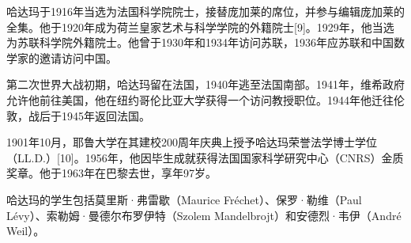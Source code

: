 哈达玛于1916年当选为法国科学院院士，接替庞加莱的席位，并参与编辑庞加莱的全集。他于1920年成为荷兰皇家艺术与科学学院的外籍院士[9]。1929年，他当选为苏联科学院外籍院士。他曾于1930年和1934年访问苏联，1936年应苏联和中国数学家的邀请访问中国。

第二次世界大战初期，哈达玛留在法国，1940年逃至法国南部。1941年，维希政府允许他前往美国，他在纽约哥伦比亚大学获得一个访问教授职位。1944年他迁往伦敦，战后于1945年返回法国。

1901年10月，耶鲁大学在其建校200周年庆典上授予哈达玛荣誉法学博士学位（LL.D.）[10]。1956年，他因毕生成就获得法国国家科学研究中心（CNRS）金质奖章。他于1963年在巴黎去世，享年97岁。

哈达玛的学生包括莫里斯·弗雷歇（Maurice Fréchet）、保罗·勒维（Paul Lévy）、索勒姆·曼德尔布罗伊特（Szolem Mandelbrojt）和安德烈·韦伊（André Weil）。
